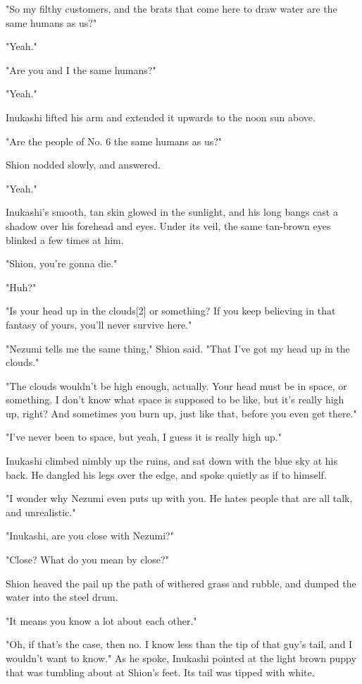 "So my filthy customers, and the brats that come here to draw water are
the same humans as us?"

"Yeah."

"Are you and I the same humans?"

"Yeah."

Inukashi lifted his arm and extended it upwards to the noon sun above.

"Are the people of No. 6 the same humans as us?"

Shion nodded slowly, and answered.

"Yeah."

Inukashi's smooth, tan skin glowed in the sunlight, and his long bangs
cast a shadow over his forehead and eyes. Under its veil, the same
tan-brown eyes blinked a few times at him.

"Shion, you're gonna die."

"Huh?"

"Is your head up in the clouds{[}2{]} or something? If you keep
believing in that fantasy of yours, you'll never survive here."

"Nezumi tells me the same thing," Shion said. "That I've got my head up
in the clouds."

"The clouds wouldn't be high enough, actually. Your head must be in
space, or something. I don't know what space is supposed to be like, but
it's really high up, right? And sometimes you burn up, just like that,
before you even get there."

"I've never been to space, but yeah, I guess it is really high up."

Inukashi climbed nimbly up the ruins, and sat down with the blue sky at
his back. He dangled his legs over the edge, and spoke quietly as if to
himself.

"I wonder why Nezumi even puts up with you. He hates people that are all
talk, and unrealistic."

"Inukashi, are you close with Nezumi?"

"Close? What do you mean by close?"

Shion heaved the pail up the path of withered grass and rubble, and
dumped the water into the steel drum.

"It means you know a lot about each other."

"Oh, if that's the case, then no. I know less than the tip of that guy's
tail, and I wouldn't want to know." As he spoke, Inukashi pointed at the
light brown puppy that was tumbling about at Shion's feet. Its tail was
tipped with white.

